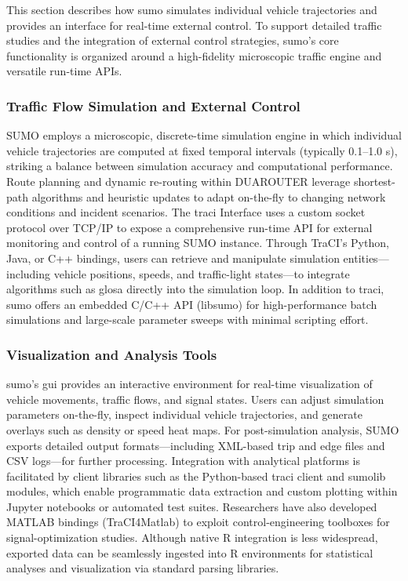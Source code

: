 This section describes how \ac{sumo} simulates individual vehicle trajectories and provides an interface for real-time external control. To support detailed traffic studies and the integration of external control strategies, \ac{sumo}’s core functionality is organized around a high-fidelity microscopic traffic engine and versatile run-time APIs. \cite{TraCIDocs2024}\cite{Krajzewicz2002}

\subsubsection{Traffic Flow Simulation and External Control}
\label{subsubsec:traffic_flow_control}

SUMO employs a microscopic, discrete-time simulation engine in which individual vehicle trajectories are computed at fixed temporal intervals (typically 0.1–1.0 s), striking a balance between simulation accuracy and computational performance. \cite{Koutsopoulos2005Microsim}\cite{Krajzewicz2002} Route planning and dynamic re-routing within DUAROUTER leverage shortest-path algorithms and heuristic updates to adapt on-the-fly to changing network conditions and incident scenarios. \cite{SUMODocs2025}
\mynewline
The \ac{traci} Interface uses a custom socket protocol over TCP/IP to expose a comprehensive run-time API for external monitoring and control of a running SUMO instance. Through TraCI’s Python, Java, or C++ bindings, users can retrieve and manipulate simulation entities—including vehicle positions, speeds, and traffic-light states—to integrate algorithms such as \ac{glosa} directly into the simulation loop. \cite{TraCIDocs2024}\cite{Krajzewicz2002} In addition to \ac{traci}, \ac{sumo} offers an embedded C/C++ API (libsumo) for high-performance batch simulations and large-scale parameter sweeps with minimal scripting effort. \cite{SUMODocs2025}

\subsubsection{Visualization and Analysis Tools}
\label{subsubsec:visualization_analysis_tools}

\ac{sumo}’s \ac{gui} provides an interactive environment for real-time visualization of vehicle movements, traffic flows, and signal states. Users can adjust simulation parameters on-the-fly, inspect individual vehicle trajectories, and generate overlays such as density or speed heat maps. For post-simulation analysis, SUMO exports detailed output formats—including XML-based trip and edge files and CSV logs—for further processing. \cite{Krajzewicz2002}
\mynewline
Integration with analytical platforms is facilitated by client libraries such as the Python-based \ac{traci} client and sumolib modules, which enable programmatic data extraction and custom plotting within Jupyter notebooks or automated test suites. \cite{Krajzewicz2002} Researchers have also developed MATLAB bindings (TraCI4Matlab) to exploit control-engineering toolboxes for signal-optimization studies. \cite{TraCI4Matlab2025} Although native R integration is less widespread, exported data can be seamlessly ingested into R environments for statistical analyses and visualization via standard parsing libraries.

